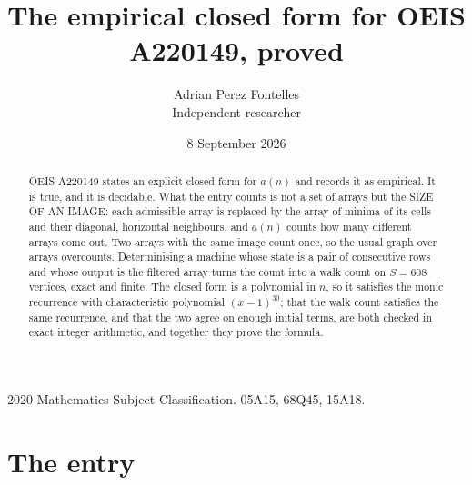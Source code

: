 \documentclass[11pt,a4paper]{article}
\title{The empirical closed form for OEIS A220149, proved}
\author{Adrian Perez Fontelles\\ \small Independent researcher}
\date{8 September 2026}
\theoremstyle{plain}
\theoremstyle{definition}
\begin{document}
\maketitle

\begin{abstract}
OEIS A220149 states an explicit closed form for $a(n)$ and records it as empirical. It is true, and
it is decidable. What the entry counts is not a set of arrays but the SIZE OF AN IMAGE: each
admissible array is replaced by the array of minima of its cells and their diagonal, horizontal neighbours,
and $a(n)$ counts how many different arrays come out. Two arrays with the same image count
once, so the usual graph over arrays overcounts. Determinising a machine whose state is a pair
of consecutive rows and whose output is the filtered array turns the count into a walk count on
$S=608$ vertices, exact and finite. The closed form is a polynomial in $n$, so it satisfies the
monic recurrence with characteristic polynomial $(x-1)^{30}$; that the walk count
satisfies the same recurrence, and that the two agree on enough initial terms, are both checked
in exact integer arithmetic, and together they prove the formula.
\end{abstract}

\noindent\small 2020 Mathematics Subject Classification. 05A15, 68Q45, 15A18.\normalsize

\section{The entry}
\end{document}
